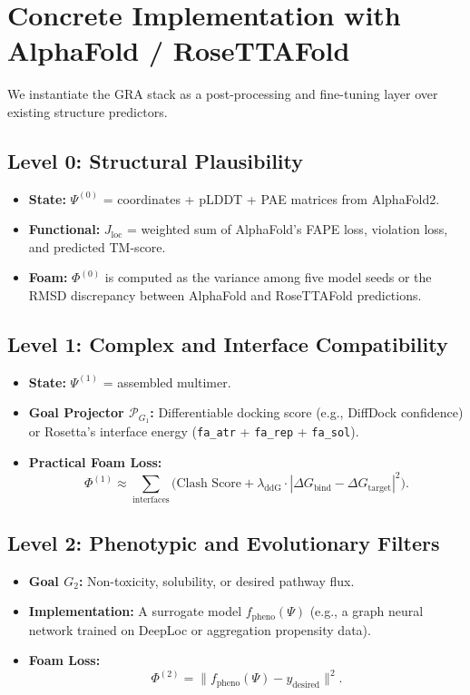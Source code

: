 \documentclass[11pt]{article}
\newcommand{\cP}{\mathcal{P}}
\begin{document}
\section{Concrete Implementation with AlphaFold / RoseTTAFold}

We instantiate the GRA stack as a post-processing and fine-tuning layer over existing structure predictors.

\subsection{Level 0: Structural Plausibility}
\begin{itemize}
    \item \textbf{State:} \(\Psi^{(0)}\) = coordinates + pLDDT + PAE matrices from AlphaFold2.
    \item \textbf{Functional:} \(J_{\text{loc}}\) = weighted sum of AlphaFold's FAPE loss, violation loss, and predicted TM-score.
    \item \textbf{Foam:} \(\Phi^{(0)}\) is computed as the variance among five model seeds or the RMSD discrepancy between AlphaFold and RoseTTAFold predictions.
\end{itemize}

\subsection{Level 1: Complex and Interface Compatibility}
\begin{itemize}
    \item \textbf{State:} \(\Psi^{(1)}\) = assembled multimer.
    \item \textbf{Goal Projector \(\cP_{G_1}\):} Differentiable docking score (e.g., DiffDock confidence) or Rosetta's interface energy (\texttt{fa\_atr} + \texttt{fa\_rep} + \texttt{fa\_sol}).
    \item \textbf{Practical Foam Loss:}
    \begin{equation}
    \Phi^{(1)} \approx \sum_{\text{interfaces}} \big( \text{Clash Score} + \lambda_{\text{ddG}} \cdot |\Delta G_{\text{bind}} - \Delta G_{\text{target}}|^2 \big).
    \end{equation}
\end{itemize}

\subsection{Level 2: Phenotypic and Evolutionary Filters}
\begin{itemize}
    \item \textbf{Goal \(G_2\):} Non-toxicity, solubility, or desired pathway flux.
    \item \textbf{Implementation:} A surrogate model \(f_{\text{pheno}}(\Psi)\) (e.g., a graph neural network trained on DeepLoc or aggregation propensity data).
    \item \textbf{Foam Loss:}
    \begin{equation}
    \Phi^{(2)} = \| f_{\text{pheno}}(\Psi) - y_{\text{desired}} \|^2.
    \end{equation}
\end{itemize}
\end{document}
